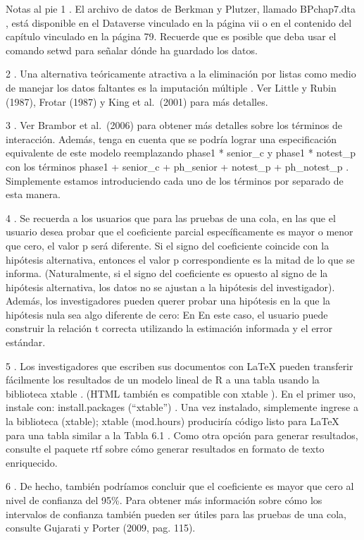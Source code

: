 \documentclass[
]{book}
\begin{document}
Notas al pie
1 .
El archivo de datos de Berkman y Plutzer, llamado BPchap7.dta , está disponible en el Dataverse vinculado en la página vii o en el contenido del capítulo vinculado en la página 79. Recuerde que es posible que deba usar el comando setwd para señalar dónde ha guardado los datos.

2 .
Una alternativa teóricamente atractiva a la eliminación por listas como medio de manejar los datos faltantes es la imputación múltiple . Ver Little y Rubin (1987), Frotar (1987) y King et al.~(2001) para más detalles.

3 .
Ver Brambor et al.~(2006) para obtener más detalles sobre los términos de interacción. Además, tenga en cuenta que se podría lograr una especificación equivalente de este modelo reemplazando phase1 * senior\_c y phase1 * notest\_p con los términos phase1 + senior\_c + ph\_senior + notest\_p + ph\_notest\_p . Simplemente estamos introduciendo cada uno de los términos por separado de esta manera.

4 .
Se recuerda a los usuarios que para las pruebas de una cola, en las que el usuario desea probar que el coeficiente parcial específicamente es mayor o menor que cero, el valor p será diferente. Si el signo del coeficiente coincide con la hipótesis alternativa, entonces el valor p correspondiente es la mitad de lo que se informa. (Naturalmente, si el signo del coeficiente es opuesto al signo de la hipótesis alternativa, los datos no se ajustan a la hipótesis del investigador). Además, los investigadores pueden querer probar una hipótesis en la que la hipótesis nula sea algo diferente de cero: En En este caso, el usuario puede construir la relación t correcta utilizando la estimación informada y el error estándar.

5 .
Los investigadores que escriben sus documentos con LaTeX pueden transferir fácilmente los resultados de un modelo lineal de R a una tabla usando la biblioteca xtable . (HTML también es compatible con xtable ). En el primer uso, instale con: install.packages (``xtable'') . Una vez instalado, simplemente ingrese a la biblioteca (xtable); xtable (mod.hours) produciría código listo para LaTeX para una tabla similar a la Tabla 6.1 . Como otra opción para generar resultados, consulte el paquete rtf sobre cómo generar resultados en formato de texto enriquecido.

6 .
De hecho, también podríamos concluir que el coeficiente es mayor que cero al nivel de confianza del 95\%. Para obtener más información sobre cómo los intervalos de confianza también pueden ser útiles para las pruebas de una cola, consulte Gujarati y Porter (2009, pag. 115).
\end{document}
